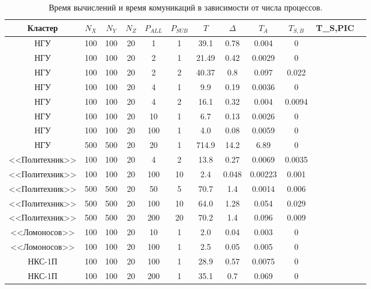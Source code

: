 \begin{table}[ht]
\begin{center}
\caption{Время вычислений и время комуникаций в зависимости от числа  процессов.}
\begin{tabular}{|c|c|c|c|c|c|c|c|c|c|c|c|}
\hline			
Кластер & $N_X$ & $N_Y$ & $N_Z$ &$P_{ALL}$  & $P_{SUB}$ & $T$ & $\Delta$ & $T_{A}$ &  $T_{S,B}$ & T_{S,PIC} \\\hline
НГУ     & 100   & 100   & 20    &  1        & 1         & 39.1  & 0.78 & 0.004         & 0      &    \\\hline
НГУ     & 100   & 100   & 20    &  2        & 1         & 21.49 & 0.42 & 0.0029         & 0     &    \\\hline
НГУ     & 100   & 100   & 20    &  2        & 2         & 40.37 & 0.8 & 0.097         & 0.022   &    \\\hline
НГУ     & 100   & 100   & 20    &  4        & 1         & 9.9 & 0.19 & 0.0036         & 0       &    \\\hline
НГУ     & 100   & 100   & 20    &  4        & 2         & 16.1 & 0.32 & 0.004         & 0.0094  &    \\\hline
НГУ     & 100   & 100   & 20    &  10       & 1         & 6.7 & 0.13 & 0.0026         & 0       &    \\\hline
НГУ     & 100   & 100   & 20    &  100      & 1         & 4.0   & 0.08 & 0.0059         & 0     &    \\\hline
НГУ     & 500   & 500   & 20    &  20       & 1         & 714.9 & 14.2 & 6.89         & 0       &    \\\hline
<<Политехник>> & 100   & 100   & 20    &  4       & 2         & 13.8 & 0.27 & 0.0069  & 0.0035  &    \\\hline
<<Политехник>> & 100   & 100   & 20    &  100     & 10        & 2.4 & 0.048 & 0.00223 & 0.001   &    \\\hline
<<Политехник>> & 500   & 500   & 20    &  50       & 5        & 70.7 & 1.4 & 0.0014   & 0.006   &    \\\hline
<<Политехник>> & 500   & 500   & 20    &  100       & 10      & 64.0 & 1.28 & 0.054   & 0.029   &    \\\hline
<<Политехник>> & 500   & 500   & 20    &  200       & 20      & 70.2 & 1.4 & 0.096    & 0.009   &    \\\hline
<<Ломоносов>> & 100   & 100   & 20    &  10       & 1         & 2.0 & 0.04 & 0.003    & 0       &    \\\hline
<<Ломоносов>> & 100   & 100   & 20    &  100       & 1        & 2.5 & 0.05 & 0.005    & 0       &    \\\hline
НКС-1П        & 100   & 100   & 20    &  100       & 1        & 28.9 & 0.57 & 0.0075  & 0       &    \\\hline
НКС-1П        & 100   & 100   & 20    &  200       & 1        & 35.1 & 0.7 & 0.069    & 0       &    \\\hline

\end{tabular}
\end{center}
\label{modern_PIC_params}
\end{table}
